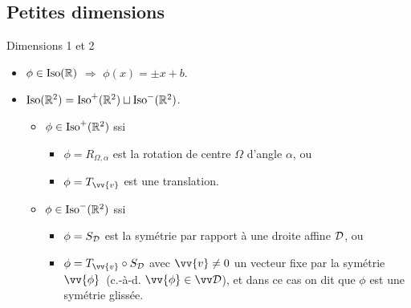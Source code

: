 \documentclass[bigger]{m53beamer}
\begin{document}
\subsection{Petites dimensions}
\begin{frame}{Dimensions 1 et 2}
  \begin{itemize}[<+(1)->]
    \item $\phi \in \operatorname{Iso}(\mathbb{R})$ $\Rightarrow$ $\phi(x) = \pm x +b$.\pause\\
    \item $\operatorname{Iso}(\mathbb{R}^{2}) = \operatorname{Iso}^{+}(\mathbb{R}^{2}) \sqcup \operatorname{Iso}^{-}(\mathbb{R}^{2})$.
      \begin{itemize}[<+(1)->]
        \item $\phi\in\operatorname{Iso}^{+}(\mathbb{R}^{2})$ ssi\pause
          \begin{itemize}[<.(1)->]
            \item $\phi = R_{\Omega,\alpha}$ est la rotation de centre $\Omega$ d'angle $\alpha$\pause, ou
            \item $\phi = T_{\vv{v}}$ est une translation.
          \end{itemize}
        \item $\phi\in\operatorname{Iso}^{-}(\mathbb{R}^{2})$ ssi\pause
          \begin{itemize}[<.(1)->]
            \item $\phi = S_{\mathcal{D}}$ est la symétrie par rapport à une droite affine $\mathcal{D}$\pause, ou
            \item $\phi = T_{\vv{v}}\circ S_{\ens{D}}$ avec $\vv{v}\neq0$ un vecteur fixe par la symétrie $\vv{\phi}$\pause\ (c.-à-d. $\vv{\phi} \in \ev{D}$)\pause, et dans ce cas on dit que $\phi$ est une \alert{symétrie glissée}.
          \end{itemize}
      \end{itemize}\pause
  \end{itemize}
\end{frame}
\end{document}
